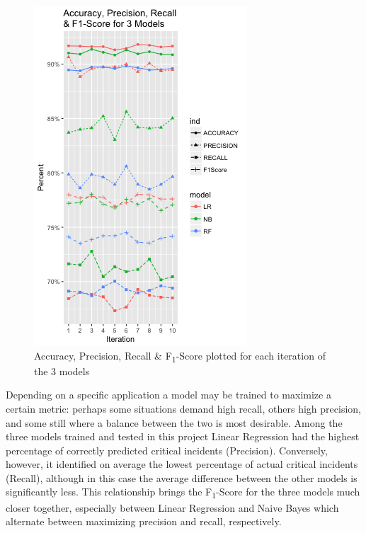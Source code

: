 \documentclass[12pt,letterpaper, oneside]
{article}
\begin{document}
\begin{figure}
	\centering
		\includegraphics[width=\textwidth]{accuracy_precision_recall_3models}
		\caption{Accuracy, Precision, Recall \& F\textsubscript{1}-Score plotted for each iteration of the 3 models
			\label{fig:eval-3models}
		}
\end{figure}

Depending on a specific application a model may be trained to maximize a certain metric: perhaps some situations demand high recall, others high precision, and some still where a balance between the two is most desirable. Among the three models trained and tested in this project Linear Regression had the highest percentage of correctly predicted critical incidents (Precision). Conversely, however, it identified on average the lowest percentage of actual critical incidents (Recall), although in this case the average difference between the other models is significantly less. This relationship brings the F\textsubscript{1}-Score for the three models much closer together, especially between Linear Regression and Naive Bayes which alternate between maximizing precision and recall, respectively. 
\end{document}
